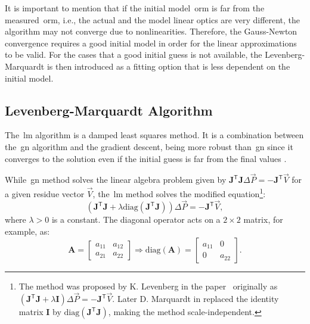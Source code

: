 It is important to mention that if the initial model~\gls{orm} is far from the measured~\gls{orm}, i.e., the actual and the model linear optics are very different, the algorithm may not converge due to nonlinearities. Therefore, the Gauss-Newton convergence requires a good initial model in order for the linear approximations to be valid. For the cases that a good initial guess is not available, the Levenberg-Marquardt is then introduced as a fitting option that is less dependent on the initial model.

\subsection{Levenberg-Marquardt Algorithm}
The~\gls{lm} algorithm is a damped least squares method. It is a combination between the~\gls{gn} algorithm and the gradient descent, being more robust than~\gls{gn} since it converges to the solution even if the initial guess is far from the final values \cite{numerical_recipes}.

While~\gls{gn} method solves the linear algebra problem given by $\mathbf{J}^{\mathsf{T}}\mathbf{J}\Delta \vec{P} = - \mathbf{J}^{\mathsf{T}} \vec{V}$ for a given residue vector $\vec{V}$, the~\gls{lm} method solves the modified equation\footnote{The method was proposed by K. Levenberg in the paper~\cite{levenberg} originally as $\left(\mathbf{J}^{\mathsf{T}}\mathbf{J} + \lambda \mathbf{I} \right)\Delta \vec{P} = - \mathbf{J}^{\mathsf{T}}\vec{V}$. Later D. Marquardt in \cite{marquardt} replaced the identity matrix $\mathbf{I}$ by $\mathrm{diag}\left(\mathbf{J}^{\mathsf{T}}\mathbf{J}\right)$, making the method scale-independent.}:
\begin{equation}
    \left(\mathbf{J}^{\mathsf{T}}\mathbf{J} + \lambda \mathrm{diag}\left(\mathbf{J}^{\mathsf{T}}\mathbf{J}\right) \right)\Delta \vec{P} = - \mathbf{J}^{\mathsf{T}}\vec{V},
    \label{eq:lm}
\end{equation}
where $\lambda > 0$ is a constant. The diagonal operator acts on a $2\times 2$ matrix, for example, as:
\begin{equation}
        \mathbf{A} = \begin{bmatrix}
     a_{11} & a_{12} \\
     a_{21} & a_{22} 
\end{bmatrix} \Rightarrow \mathrm{diag}\left(\mathbf{A}\right) = \begin{bmatrix}
     a_{11} & 0 \\
     0 & a_{22}
 \end{bmatrix}.
\end{equation}

